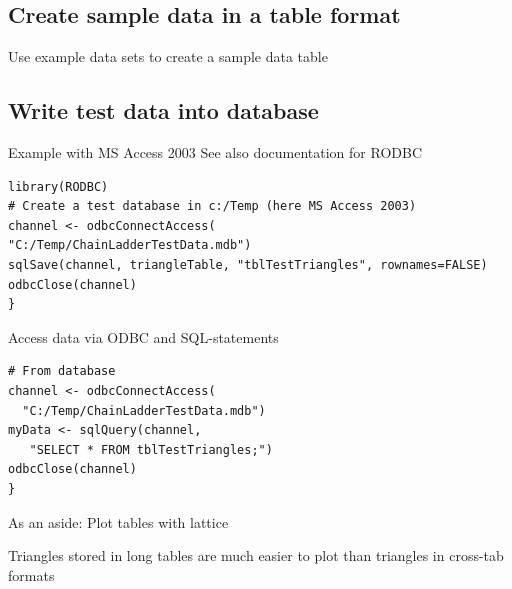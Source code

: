 \documentclass[a4paper]{article}
\begin{document}
\subsection{Create sample data in a table format}
Use example data sets to create a sample data table
\begin{Schunk}
\end{Schunk}
\subsection{Write test data into database}
Example with MS Access 2003
See also documentation for RODBC

\begin{verbatim}
library(RODBC)
# Create a test database in c:/Temp (here MS Access 2003)
channel <- odbcConnectAccess(
"C:/Temp/ChainLadderTestData.mdb")
sqlSave(channel, triangleTable, "tblTestTriangles", rownames=FALSE)
odbcClose(channel)
}
\end{verbatim}

Access data via ODBC and SQL-statements
\begin{verbatim}
# From database
channel <- odbcConnectAccess(
  "C:/Temp/ChainLadderTestData.mdb")
myData <- sqlQuery(channel,
   "SELECT * FROM tblTestTriangles;")
odbcClose(channel)
}
\end{verbatim}

As an aside: Plot tables with lattice

Triangles stored in long tables are much easier to plot than triangles in cross-tab formats
\end{document}
